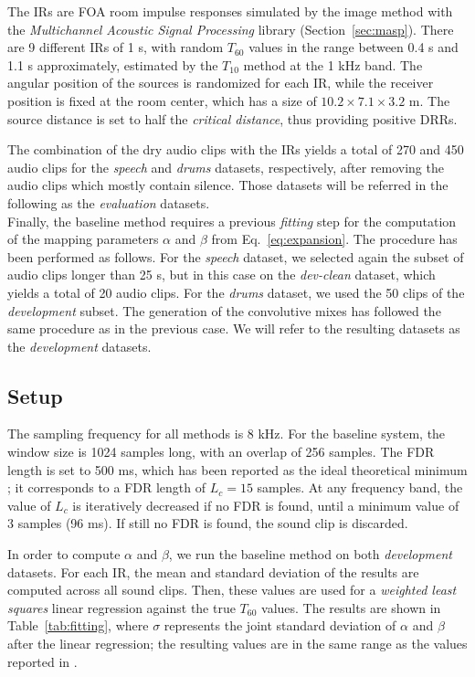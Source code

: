 The IRs are FOA room impulse responses simulated by the image method with the \textit{Multichannel Acoustic Signal Processing} library (Section~\ref{sec:masp}). There are 9 different IRs of 1 s, with random $T_{60}$ values in the range between 0.4 s and 1.1 s approximately, estimated by the $T_{10}$ method at the 1 kHz band. The angular position of the sources is randomized for each IR, while the receiver position is fixed at the room center, which has a size of $10.2 \times 7.1 \times 3.2$ m. The source distance is set to half the \textit{critical distance}, thus providing positive DRRs. 

The combination of the dry audio clips with the IRs yields a total of 270 and 450 audio clips for the \textit{speech} and \textit{drums} datasets, respectively, after removing the audio clips which mostly contain silence. Those datasets will be referred in the following as the \textit{evaluation} datasets. \\

Finally, the baseline method requires a previous \textit{fitting} step for the computation of the mapping parameters $\alpha$ and $\beta$ from Eq.~\ref{eq:expansion}. The procedure has been performed as follows.
For the \textit{speech} dataset, we selected again the subset of audio clips longer than 25 s, but in this case on the \textit{dev-clean} dataset, which yields a total of 20 audio clips. 
For the \textit{drums} dataset, we used the 50 clips of the \textit{development} subset.
The generation of the convolutive mixes has followed the same procedure as in the previous case. We will refer to the resulting datasets as the \textit{development} datasets. 


\newpage
\subsection{Setup}
\label{sec:setup}


The sampling frequency for all methods is 8 kHz.
For the baseline system, the window size is 1024 samples long, with an overlap of 256 samples. The FDR length is set to 500 ms, which has been reported as the ideal theoretical minimum \cite{prego2012blind}; it corresponds to a FDR length of $L_c = 15$ samples. 
At any frequency band, the value of $L_c$ is iteratively decreased if no FDR is found, until a minimum value of 3 samples (96 ms). If still no FDR is found, the sound clip is discarded. 

In order to compute $\alpha$ and $\beta$, we run the baseline method on both \textit{development} datasets. For each IR, the mean and standard deviation of the results are computed across all sound clips. Then, these values are used for a \textit{weighted least squares} linear regression against the true $T_{60}$ values.
The results are shown in Table~\ref{tab:fitting}, where $\sigma$ represents the joint standard deviation of $\alpha$ and $\beta$ after the linear regression; 
the resulting values are in the same range as the values reported in \cite{prego2012blind}. 


